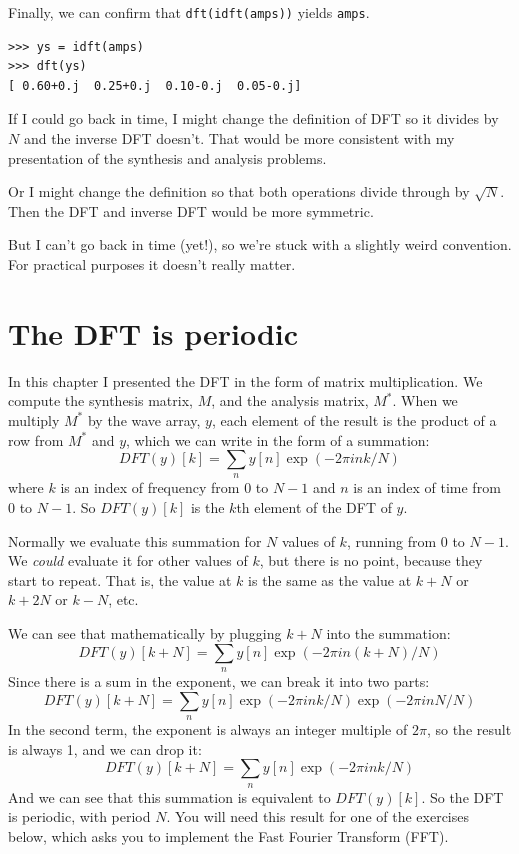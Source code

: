 \documentclass[12pt]{book}
\begin{document}
Finally, we can confirm that {\tt dft(idft(amps))} yields {\tt amps}.

\begin{verbatim}
>>> ys = idft(amps)
>>> dft(ys)
[ 0.60+0.j  0.25+0.j  0.10-0.j  0.05-0.j]
\end{verbatim}

If I could go back in time, I might change the definition of
DFT so it divides by $N$ and the inverse DFT doesn't.  That would
be more consistent with my presentation of the synthesis and analysis
problems.

Or I might change the definition so that both operations divide
through by $\sqrt{N}$.  Then the DFT and inverse DFT would be
more symmetric.

But I can't go back in time (yet!), so we're stuck with a slightly
weird convention.  For practical purposes it doesn't really
matter.


\section{The DFT is periodic}

In this chapter I presented the DFT in the form of matrix multiplication.
We compute the synthesis matrix, $M$, and the analysis matrix, $M^*$.
When we multiply $M^{*}$ by the wave array, $y$, each element of the
result is the product of a row from $M^*$ and $y$, which we can
write in the form of a summation:
%
\[ DFT(y)[k] = \sum_n y[n] \exp(-2 \pi i n k / N) \]
%
where $k$ is an index of frequency from
$0$ to $N-1$ and $n$ is an index of time from $0$ to $N-1$.
So $DFT(y)[k]$ is the $k$th element of the DFT of $y$.

Normally we evaluate this summation for $N$ values of $k$, running from
0 to $N-1$.  We {\em could} evaluate it for other values of $k$, but
there is no point, because they start to repeat.  That is, the value at
$k$ is the same as the value at $k+N$ or $k+2N$ or $k-N$, etc.

We can see that mathematically by plugging $k+N$ into the summation:
%
\[ DFT(y)[k+N] = \sum_n y[n] \exp(-2 \pi i n (k+N) / N) \]
%
Since there is a sum in the exponent, we can break it into two parts:
%
\[ DFT(y)[k+N] = \sum_n y[n] \exp(-2 \pi i n k / N)  \exp(-2 \pi i n N / N) \]
%
In the second term, the exponent is always an integer multiple of
$2 \pi$, so the result is always 1, and we can drop it:
%
\[ DFT(y)[k+N] = \sum_n y[n] \exp(-2 \pi i n k / N) \]
%
And we can see that this summation is equivalent to $ DFT(y)[k]$.
So the DFT is periodic, with period $N$.  You will need this result
for one of the exercises below, which asks you to implement the Fast Fourier
Transform (FFT).
\end{document}
